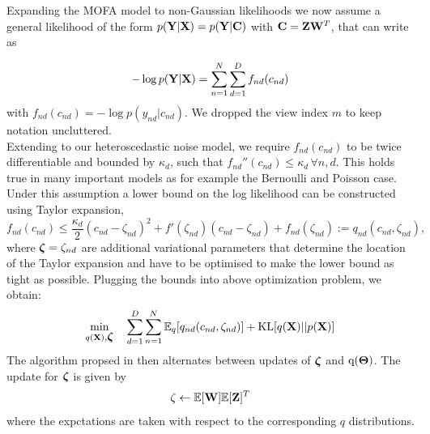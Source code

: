 Expanding the MOFA model to non-Gaussian likelihoods we now assume a general likelihood of the form $p({\bf Y}|{\bf X})=p({\bf Y}|{\bf C})$ with ${\bf C} = {\bf Z}{\bf W}^{T}$, that can write as

\begin{equation*}
-\log p({\bf Y}|{\bf X}) = \sum_{n=1}^{N} \sum_{d=1}^{D} f_{nd} (c_{nd})
\end{equation*}
with $f_{nd}(c_{nd}) = -\log p(y_{nd}|c_{nd})$. We dropped the view index $m$ to keep notation uncluttered.\\
Extending \cite{Seeger2012} to our heteroscedastic noise model, we require $f_{nd}(c_{nd})$ to be twice differentiable and bounded by $\kappa_d$, such that $f_{nd}''(c_{nd}) \leq \kappa_d \,\forall n,d$. This holds true in many important models as for example the Bernoulli and Poisson case. Under this assumption a lower bound on the log likelihood can be constructed using Taylor expansion,
\begin{equation*}
f_{nd}(c_{nd}) \leq \frac{\kappa_d}{2} (c_{nd} - \zeta_{nd})^2 + f'(\zeta_{nd})(c_{nd} - \zeta_{nd}) + f_{nd}(\zeta_{nd}) := q_{nd}(c_{nd},\zeta_{nd}),
\end{equation*}
where $\mbox{\boldmath $\zeta$} =  \zeta_{nd} $ are additional variational parameters that determine the location of the Taylor expansion and have to be optimised to make the lower bound as tight as possible. Plugging the bounds into above optimization problem, we obtain:
\begin{equation*}
\min_{q({\bf X}),\mbox{\boldmath $\zeta$}} \quad \sum_{d=1}^{D}\sum_{n=1}^{N} \mathbb{E}_q [ q_{nd}(c_{nd},\zeta_{nd})] + {\rm KL}[q({\bf X})||p({\bf X})]
\end{equation*}
The algorithm propsed in \cite{Seeger2012} then alternates between updates of $\mbox{\boldmath $\zeta$}$ and $\mathrm{q}(\mbox{\boldmath $\Theta$})$. The update for $\mbox{\boldmath $\zeta$}$ is given by
\begin{equation*}
\zeta \leftarrow \mathbb{E}[{\bf W}]\mathbb{E}[{\bf Z}]^{T}
\end{equation*}
where the expctations are taken with respect to the corresponding $q$ distributions.\\
